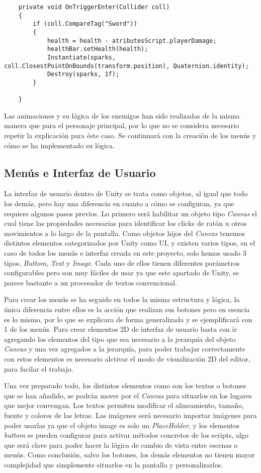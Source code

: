 \begin{lstlisting}
    private void OnTriggerEnter(Collider coll)
    {
        if (coll.CompareTag("Sword"))
        {
            health = health - atributesScript.playerDamage;
            healthBar.setHealth(health);
            Instantiate(sparks, coll.ClosestPointOnBounds(transform.position), Quaternion.identity);
            Destroy(sparks, 1f);
        }

    }
\end{lstlisting}

Las animaciones y su lógica de los enemigos han sido realizadas de la misma manera que para el personaje principal, por lo que no se considera necesario repetir la explicación para éste caso. Se continuará con la creación de los menús y cómo se ha implementado su lógica.

\subsection{Menús e Interfaz de Usuario}

La interfaz de usuario dentro de Unity se trata como objetos, al igual que todo los demás, pero hay una diferencia en cuanto a cómo se configuran, ya que requiere algunos pasos previos. Lo primero será habilitar un objeto tipo \textit{Canvas} el cual tiene las propiedades necesarias para identificar los clicks de ratón u otros movimientos a lo largo de la pantalla. Como objetos hijos del \textit{Canvas} tenemos distintos elementos categorizados por Unity como UI, y existen varios tipos, en el caso de todos los menús e interfaz creada en este proyecto, solo hemos usado 3 tipos, \textit{Buttom}, \textit{Text} y \textit{Image}. Cada uno de ellos tienen diferentes parámetros configurables pero son muy fáciles de usar ya que este apartado de Unity, se parece bastante a un procesador de textos convencional.

Para crear los menús se ha seguido en todos la misma estructura y lógica, la única diferencia entre ellos es la acción que realizan sus botones pero en esencia es lo mismo, por lo que se explicara de forma generalizada y se ejemplificará con 1 de los menús. Para crear elementos 2D de interfaz de usuario basta con ir agregando los elementos del tipo que sea necesario a la jerarquía del objeto \textit{Canvas} y una vez agregados a la jerarquía, para poder trabajar correctamente con estos elementos es necesario alctivar el modo de visualización 2D del editor, para facilar el trabajo. 

Una vez preparado todo, los distintos elementos como son los textos o botones que se han añadido, se podrán mover por el \textit{Canvas} para situarlos en los lugares que mejor convengan. Los textos permiten modificar el alineamiento, tamaño, fuente y colores de las letras. Las imágenes será necesario importar imágenes para poder usarlas ya que el objeto image es solo un \textit{PlaceHolder}, y los elementos \textit{buttom} se pueden configurar para activar métodos concretos de los scripts, algo que será clave para poder hacer la lógica de cambio de vista entre escenas o menús. Como conclusión, salvo los botones, los demás elementos no tienen mayor complejidad que simplemente situarlos en la pantalla y personalizarlos.

